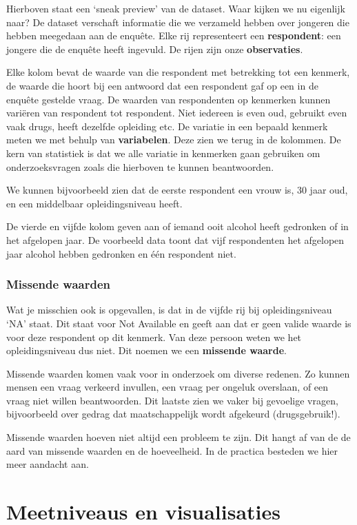 \documentclass[
  letterpaper,
  DIV=11,
  numbers=noendperiod]{scrreprt}
\begin{document}
Hierboven staat een `sneak preview' van de dataset. Waar kijken we nu
eigenlijk naar? De dataset verschaft informatie die we verzameld hebben
over jongeren die hebben meegedaan aan de enquête. Elke rij
representeert een \textbf{respondent}: een jongere die de enquête heeft
ingevuld. De rijen zijn onze \textbf{observaties}.

Elke kolom bevat de waarde van die respondent met betrekking tot een
kenmerk, de waarde die hoort bij een antwoord dat een respondent gaf op
een in de enquête gestelde vraag. De waarden van respondenten op
kenmerken kunnen variëren van respondent tot respondent. Niet iedereen
is even oud, gebruikt even vaak drugs, heeft dezelfde opleiding etc. De
variatie in een bepaald kenmerk meten we met behulp van
\textbf{variabelen}. Deze zien we terug in de kolommen. De kern van
statistiek is dat we alle variatie in kenmerken gaan gebruiken om
onderzoeksvragen zoals die hierboven te kunnen beantwoorden.

We kunnen bijvoorbeeld zien dat de eerste respondent een vrouw is, 30
jaar oud, en een middelbaar opleidingsniveau heeft.

De vierde en vijfde kolom geven aan of iemand ooit alcohol heeft
gedronken of in het afgelopen jaar. De voorbeeld data toont dat vijf
respondenten het afgelopen jaar alcohol hebben gedronken en één
respondent niet.

\subsection{Missende waarden}\label{missende-waarden}

Wat je misschien ook is opgevallen, is dat in de vijfde rij bij
opleidingsniveau `NA' staat. Dit staat voor Not Available en geeft aan
dat er geen valide waarde is voor deze respondent op dit kenmerk. Van
deze persoon weten we het opleidingsniveau dus niet. Dit noemen we een
\textbf{missende waarde}.

Missende waarden komen vaak voor in onderzoek om diverse redenen. Zo
kunnen mensen een vraag verkeerd invullen, een vraag per ongeluk
overslaan, of een vraag niet willen beantwoorden. Dit laatste zien we
vaker bij gevoelige vragen, bijvoorbeeld over gedrag dat maatschappelijk
wordt afgekeurd (drugsgebruik!).

Missende waarden hoeven niet altijd een probleem te zijn. Dit hangt af
van de de aard van missende waarden en de hoeveelheid. In de practica
besteden we hier meer aandacht aan.

\chapter{Meetniveaus en
visualisaties}\label{meetniveaus-en-visualisaties}
\end{document}
